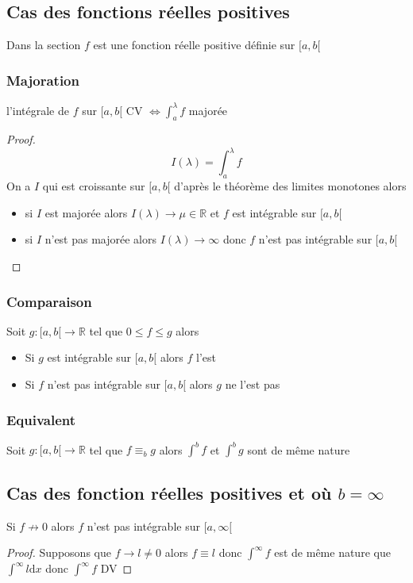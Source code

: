 \documentclass[11pt,colorlinks]{book}
\theoremstyle{mytheoremstyle}
\theoremstyle{mytheoremstyle}
\theoremstyle{mytheoremstyle}
\theoremstyle{mytheoremstyle}
\theoremstyle{mytheoremstyle}
\theoremstyle{mytheoremstyle}
\theoremstyle{mytheoremstyle}
\theoremstyle{mytheoremstyle}
\theoremstyle{myproblemstyle}
\def\mbb#1{\mathbb{#1}}
\def\bR{\mbb{R}}
\begin{document}
  \subsection{Cas des fonctions réelles positives}
  Dans la section $f$ est une fonction réelle positive définie sur $[a,b[$
  \subsubsection{Majoration}
  \begin{prop}
    l'intégrale de $f$ sur $[a,b[$ CV $\Leftrightarrow \int_a^{\lambda} f$ majorée
    \begin{proof}
      \begin{equation*}
        I(\lambda) = \int_{a}^{\lambda} f
      \end{equation*}
      On a $I$ qui est croissante sur $[a,b[$ d'après le théorème des limites monotones alors 
      \begin{itemize}
        \item si $I$ est majorée alors $I(\lambda) \to \mu \in \bR$ et $f$ est intégrable sur $[a,b[$
        \item si $I$ n'est pas majorée alors $I(\lambda) \to \infty$ donc $f$ n'est pas intégrable sur $[a,b[$
      \end{itemize}
    \end{proof}
  \end{prop}
  \subsubsection{Comparaison}
  \begin{prop}
    Soit $g : [a,b[ \to \bR$ tel que $0 \leq f \leq g$ alors 
    \begin{itemize}
      \item Si $g$ est intégrable sur $[a,b[$ alors $f$ l'est 
      \item Si $f$ n'est pas intégrable sur $[a,b[$ alors $g$ ne l'est pas
    \end{itemize}
  \end{prop}
  \subsubsection{Equivalent}
  \begin{prop}
    Soit $g : [a,b[ \to \bR$ tel que $f \equiv_b g$ alors $\int^b f$ et $\int^b g$ sont de même nature
  \end{prop}
  \subsection{Cas des fonction réelles positives et où $b=\infty$}
  \begin{prop}
    Si $f \not\to 0$ alors $f$ n'est pas intégrable sur $[a,\infty[$
    \begin{proof}
      Supposons que $f \to l \not= 0$ alors $f \equiv l$ donc $\int^{\infty} f$ est de même nature que $\int^{\infty} l \text{d}x$ donc 
      $\int^{\infty} f$ DV
    \end{proof}
  \end{prop}
\end{document}
